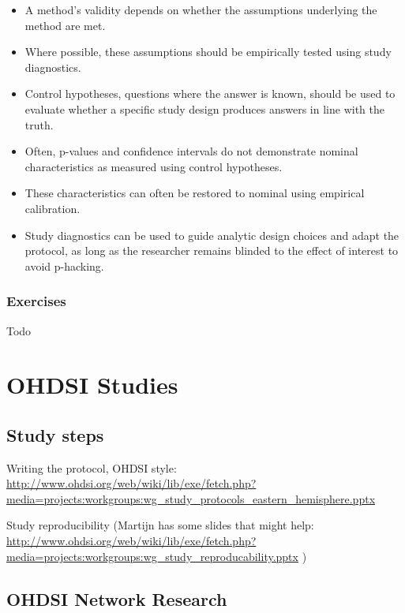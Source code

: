 \documentclass[11pt]{book}
\theoremstyle{definition}
\theoremstyle{definition}
\theoremstyle{definition}
\theoremstyle{remark}
\let\BeginKnitrBlock\begin \let\EndKnitrBlock\end
\begin{document}
\BeginKnitrBlock{rmdsummary}
\begin{itemize}
\item
  A method's validity depends on whether the assumptions underlying the method are met.
\item
  Where possible, these assumptions should be empirically tested using study diagnostics.
\item
  Control hypotheses, questions where the answer is known, should be used to evaluate whether a specific study design produces answers in line with the truth.
\item
  Often, p-values and confidence intervals do not demonstrate nominal characteristics as measured using control hypotheses.
\item
  These characteristics can often be restored to nominal using empirical calibration.
\item
  Study diagnostics can be used to guide analytic design choices and adapt the protocol, as long as the researcher remains blinded to the effect of interest to avoid p-hacking.
\end{itemize}
\EndKnitrBlock{rmdsummary}

\hypertarget{exercises-4}{%
\section{Exercises}\label{exercises-4}}

Todo

\hypertarget{part-ohdsi-studies}{%
\part{OHDSI Studies}\label{part-ohdsi-studies}}

\hypertarget{StudySteps}{%
\chapter{Study steps}\label{StudySteps}}

Writing the protocol, OHDSI style: \url{http://www.ohdsi.org/web/wiki/lib/exe/fetch.php?media=projects:workgroups:wg_study_protocols_eastern_hemisphere.pptx}

Study reproducibility (Martijn has some slides that might help: \url{http://www.ohdsi.org/web/wiki/lib/exe/fetch.php?media=projects:workgroups:wg_study_reproducability.pptx} )

\hypertarget{NetworkResearch}{%
\chapter{OHDSI Network Research}\label{NetworkResearch}}
\end{document}
